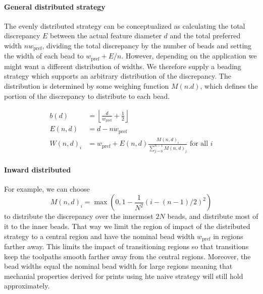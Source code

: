\paragraph{General distributed strategy}
The evenly distributed strategy can be conceptualized as calculating the total discrepancy $E$ between the actual feature diameter $d$ and the total preferred width $n w_\text{pref}$, dividing the total discrepancy by the number of beads and setting the width of each bead to 
$w_\text{pref} + E / n$.
However, depending on the application we might want a different distribution of widths.
We therefore supply a beading strategy which supports an arbitrary distribution of the discrepancy.
The distribution is determined by some weighing function $M(n.d)$, which defines the portion of the discrepancy to distribute to each bead.


\begin{align*}
b(d) &= \left\lfloor \frac{d}{ w_\text{pref}} + \frac12 \right\rfloor \\
E(n,d) &= d - n w_\text{pref} \\
W(n,d)_i &= w_\text{pref} + E(n,d) \frac{M(n,d)_i}{\sum_{j=0}^{n-1} M(n,d)_j} \text{ for all } i 
\end{align*}


\paragraph{Inward distributed}
For example, we can choose 
$$M(n,d)_i = \max(0, 1 - \frac{1}{N^2} (i - (n-1)/2)^2 )$$
to distribute the discrepancy over the innermost $2N$ beads, and distribute most of it to the inner beads.
That way we limit the region of impact of the distributed strategy to a central region and have the nominal bead width $w_\text{pref}$ in regions farther away.
This limits the impact of transitioning regions so that transitions keep the toolpaths smooth farther away from the central regions. %
Moreover, the bead widths equal the nominal bead width for large regions meaning that mechanial properties derived for prints using hte naive strategy will still hold approximately.





